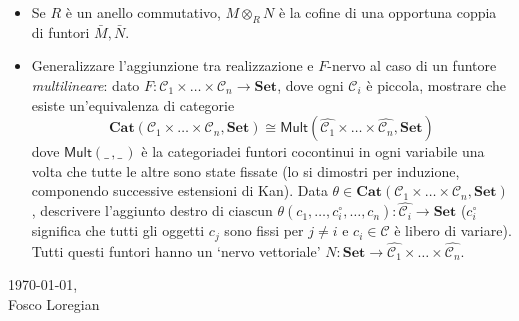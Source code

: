 \documentclass{amsart}
\def\Cat{\mathbf{Cat}}
\begin{document}
\begin{itemize}
\item Se $R$ è un anello commutativo, $M\otimes_R N$ è la cofine di una opportuna coppia di funtori $\bar M,\bar N$.
\item Generalizzare l'aggiunzione tra realizzazione e $F$-nervo al caso di un funtore \emph{multilineare}: dato $F \colon \mathcal C_1 \times \dots \times \mathcal C_n \to \mathbf{Set}$, dove ogni  $\mathcal{C}_i$ è piccola, mostrare che esiste un'equivalenza di categorie
\[
\Cat(\mathcal{C}_1 \times \dots \times \mathcal{C}_n , \mathbf{Set}) \cong 
\textsf{Mult}(\widehat{\mathcal{C}_1}\times \dots \times \widehat{\mathcal{C}_n}, \mathbf{Set})
\]
dove $\textsf{Mult}(\_\, , \_\,)$ è la categoriadei funtori cocontinui in ogni variabile una volta che tutte le altre sono state fissate (lo si dimostri per induzione, componendo successive estensioni di Kan). Data $\theta \in \Cat(\mathcal{C}_1 \times \dots \times \mathcal{C}_n , \mathbf{Set})$, descrivere l'aggiunto destro di ciascun $\theta(c_1,\dots,c_i^\circ,\dots, c_n)\colon \widehat{\mathcal{C}_i} \to \mathbf{Set}$ ($c_i^\circ$ significa che tutti gli oggetti $c_j$ sono fissi per $j\neq i$ e $c_i\in\mathcal{C}$ è libero di variare). Tutti questi funtori hanno un `nervo vettoriale' $N\colon \mathbf{Set} \to \widehat{\mathcal{C}_1}\times \dots \times \widehat{\mathcal{C}_n}$.
\end{itemize}

\vspace{\fill}
\begin{flushright}
\today,\\
Fosco Loregian
\end{flushright}
\end{document}
